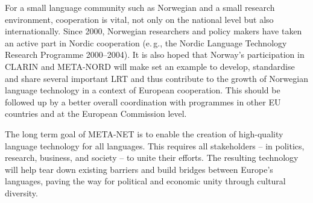 \begin{multicols}{2}
For a small language community such as Norwegian and a small research
environment, cooperation is vital, not only on the national level but
also internationally. Since 2000, Norwegian researchers and policy
makers have taken an active part in Nordic cooperation (e.\,g., the Nordic Language Technology Research Programme 2000–2004). It is also hoped that Norway’s participation in CLARIN and META-NORD will make set an example to develop, standardise and share several important LRT and thus contribute to the growth of Norwegian language technology in a context of European cooperation. This should be followed up by a better overall coordination with programmes in other EU countries and at the European Commission level.



The long term goal of META-NET is to enable the creation of high-quality language technology for all languages. This requires all stakeholders -- in politics, research, business, and society -- to unite their efforts. The resulting technology will help tear down existing barriers and build bridges between Europe’s languages, paving the way for political and economic unity through cultural diversity. 

\end{multicols}

\clearpage


